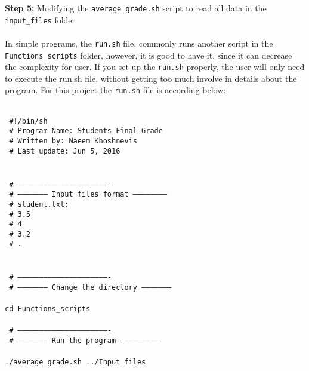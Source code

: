 \textbf{Step 5:} Modifying the  \texttt{average\_grade.sh} script to read all data in the \texttt{input\_files} folder \\
\\
\noindent
In simple programs, the \texttt{run.sh} file, commonly runs another script in the \texttt{Functions\_scripts} folder, however, it is good to have it, since it can decrease the complexity for user. If you set up the \texttt{run.sh} properly, the user will only need to execute the run.sh file, without getting too much involve in details about the program. For this project the \texttt{run.sh} file is according below:\\

 \begin{mdframed}[hidealllines=true,backgroundcolor=gray!20]
 \begin{singlespace}
 \fontsize{10pt}{1pt}
\texttt{
\\
\noindent
{ \color{matlab_green}  \#!/bin/sh}\\
{ \color{matlab_green}  \# Program Name: Students Final Grade}\\
{ \color{matlab_green}  \# Written by: Naeem Khoshnevis}\\
{ \color{matlab_green}  \# Last update: Jun 5, 2016}\\
\\
\\
{ \color{matlab_green} \# ----------------------------------------------------------------} \\
{ \color{matlab_green} \# --------------------- Input files format -----------------------} \\
{ \color{matlab_green} \# student.txt:} \\
{ \color{matlab_green} \# 3.5} \\
{ \color{matlab_green} \# 4} \\
{ \color{matlab_green} \# 3.2} \\
{ \color{matlab_green} \# .} \\
\\
\\
{ \color{matlab_green} \# ----------------------------------------------------------------} \\
{ \color{matlab_green} \# --------------------- Change the directory ---------------------} \\
\\
cd \texttt{Functions\_scripts}\\
\\
{ \color{matlab_green} \# ----------------------------------------------------------------} \\
{ \color{matlab_green} \# --------------------- Run the program --------------------------} \\
\\
./average\_grade.sh ../Input\_files\\
 }
 \end{singlespace}
\end{mdframed}
